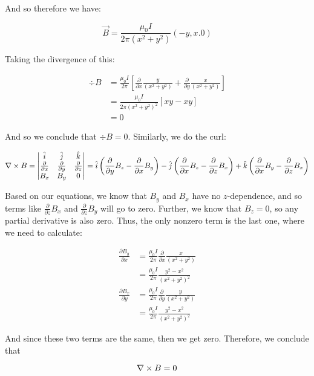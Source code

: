 \documentclass[10pt]{article}
\begin{document}
\begin{enumerate}[(a)]
\begin{solution}
            And so therefore we have: 

            \[ \vec B = \frac{\mu_0 I}{2\pi(x^2 + y^2)} (-y,x.0)\]
            
            Taking the divergence of this: 

            \begin{align*}
                \div B &= \frac{\mu_0 I}{2\pi}\left[\frac{\partial}{\partial x} \frac{y}{(x^2 + y^2)} + \frac{\partial}{\partial y} \frac{x}{(x^2 + y^2)}\right]\\
                &= \frac{\mu_0 I}{2\pi (x^2 + y^2)^2}\left[ xy - xy\right]\\
                &= 0
            \end{align*}

            And so we conclude that $\div B = 0$. Similarly, we do the curl: 

            \begin{align*}
                \nabla \times B = \begin{vmatrix}
                    \hat i & \hat j & \hat k\\
                    \frac{\partial}{\partial x} & \frac{\partial}{\partial y} & \frac{\partial}{\partial z}\\
                    B_x & B_y & 0
                \end{vmatrix} = \hat i\left(\frac{\partial}{\partial y}B_z - \frac{\partial}{\partial x}B_y\right) - \hat j \left( \frac{\partial}{\partial x}B_z - \frac{\partial}{\partial z}B_x\right) + \hat k \left( \frac{\partial}{\partial x}B_y - \frac{\partial}{\partial z}B_x\right)
            \end{align*}

            Based on our equations, we know that $B_y$ and $B_x$ have no $z$-dependence, and so terms like $\frac{\partial}{\partial z}B_x$ and $\frac{\partial}{\partial z}B_y$ will go to zero. Further, we know that $B_z = 0$, so any partial derivative is also zero. Thus, the only nonzero term is the last one, where we need to calculate:

            \begin{align*}
                \frac{\partial B_y}{\partial x} &= \frac{\mu_0I}{2\pi} \frac{\partial}{\partial x} \frac{x}{(x^2 +y^2)}\\
                &= \frac{\mu_0 I}{2\pi} \frac{y^2 - x^2}{(x^2 + y^2)^2}\\
                \frac{\partial B_x}{\partial y} &= \frac{\mu_0 I}{2\pi} \frac{\partial}{\partial y} \frac{y}{(x^2 + y^2)}\\
                &= \frac{\mu_0 I}{2\pi}\frac{y^2 - x^2}{(x^2 + y^2)^2} 
            \end{align*}

            And since these two terms are the same, then we get zero. Therefore, we conclude that 

            \[ \nabla \times B = 0\] 

            


        \end{solution}
    \end{enumerate}
\end{document}
